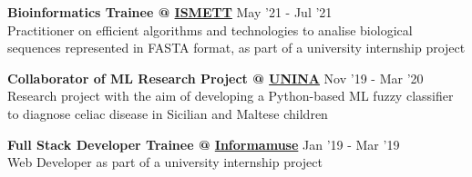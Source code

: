 \documentclass[11pt,letterpaper]{article}
\begin{document}
\begin{justify}
\begin{itemize}[label={}, leftmargin=0pt]
\begin{item}
            \end{item}
            \begin{item}
                  \textbf{Bioinformatics Trainee @ \href{https://www.ismett.edu/en/}{ISMETT}}
                  \hfill
                  May '21 - Jul '21
                  \vspace{0.05cm}
                  \\
                  Practitioner on efficient algorithms and technologies to analise biological sequences represented in FASTA format, as part of a university internship project
            \end{item}
            \begin{item}
                  \textbf{Collaborator of ML Research Project @ \href{https://www.unina.it/en_GB}{UNINA}}
                  \hfill
                  Nov '19 - Mar '20
                  \vspace{0.05cm}
                  \\
                  Research project with the aim of developing a Python-based ML fuzzy classifier to diagnose celiac disease in Sicilian and Maltese children
            \end{item}
            \begin{item}
                  \textbf{Full Stack Developer Trainee @ \href{https://www.informamuse.com/en/home/}{Informamuse}}
                  \hfill
                  Jan '19 - Mar '19
                  \vspace{0.05cm}
                  \\
                  Web Developer as part of a university internship project
            \end{item}
      \end{itemize}


\end{justify}
\end{document}
